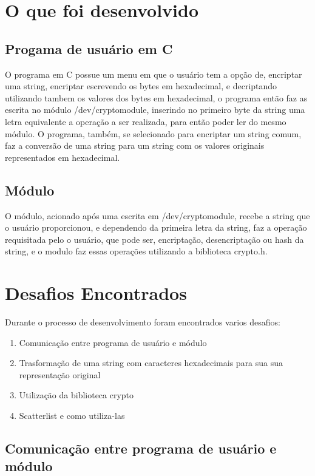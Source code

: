\section{O que foi desenvolvido}

\subsection{Progama de usuário em C}

O programa em C possue um menu em que o usuário tem a opção de, encriptar uma string, encriptar escrevendo os bytes em hexadecimal, e decriptando utilizando tambem os valores dos bytes em hexadecimal, o programa então faz as escrita no módulo /dev/cryptomodule, inserindo no primeiro byte da string uma letra equivalente a operação a ser realizada, para então poder ler do mesmo módulo. O programa, também, se selecionado para encriptar um string comum, faz a conversão de uma string para um string com os valores originais representados em hexadecimal.

\subsection{Módulo}

O módulo, acionado após uma escrita em /dev/cryptomodule, recebe a string que o usuário proporcionou, e dependendo da primeira letra da string, faz a operação requisitada pelo o usuário, que pode ser, encriptação, desencriptação ou hash da string, e o modulo faz essas operações utilizando a biblioteca crypto.h.

\vfill

\section{Desafios Encontrados}

Durante o processo de desenvolvimento foram encontrados varios desafios:

\begin{enumerate}
\item Comunicação entre programa de usuário e módulo
\item Trasformação de uma string com caracteres hexadecimais para sua sua representação original
\item Utilização da biblioteca crypto
\item Scatterlist e como utiliza-las
\end{enumerate}

\subsection{Comunicação entre programa de usuário e módulo}

